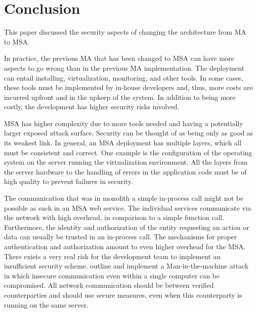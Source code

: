 \section{Conclusion}
\begin{sloppypar}
    This paper discussed the security aspects of changing the architecture from
    MA to MSA.
\end{sloppypar}
\begin{sloppypar}
    In practice, the previous MA that has been changed to MSA can have more
    aspects to go wrong than in the previous MA implementation. The deployment
    can entail installing, virtualization, monitoring, and other tools. In some
    cases, these tools must be implemented by in-house developers and, thus,
    more costs are incurred upfront and in the upkeep of the system. In addition
    to being more costly, the development has higher security risks involved.
\end{sloppypar}
\begin{sloppypar}
    MSA has higher complexity due to more tools needed and having a potentially
    larger exposed attack surface. Security can be thought of as being only as
    good as its weakest link. In general, an MSA deployment has multiple layers,
    which all must be consistent and correct. One example is the configuration
    of the operating system on the server running the virtualization
    environment. All the layers from the server hardware to the handling of
    errors in the application code must be of high quality to prevent failures
    in security.
\end{sloppypar}
\begin{sloppypar}
    The communication that was in monolith a simple in-process call might not be
    possible as such in an MSA web service. The individual services communicate
    via the network with high overhead, in comparison to a simple function call.
    Furthermore, the identity and authorization of the entity requesting an
    action or data can usually be trusted in an in-process call. The mechanisms
    for proper authentication and authorization amount to even higher overhead
    for the MSA. There exists a very real risk for the development team to
    implement an insufficient security scheme. \citet{maninthemachine} outline
    and implement a Man-in-the-machine attack in which insecure communication
    even within a single computer can be compromised. All network communication
    should be between verified counterparties and should use secure measures,
    even when this counterparty is running on the same server.
\end{sloppypar}
